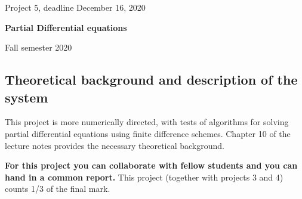 \documentclass[%
oneside,                 %
final,                   %
10pt]{article}
\begin{document}

\newcommand{\exercisesection}[1]{\subsection*{#1}}






\thispagestyle{empty}

\begin{center}
{\LARGE\bf
\begin{spacing}{1.25}
Project 5, deadline  December 16, 2020
\end{spacing}
}
\end{center}


\begin{center}
{\bf Partial Differential equations${}^{}$} \\ [0mm]
\end{center}

\begin{center}
\end{center}
    

\begin{center}
Fall semester 2020
\end{center}

\vspace{1cm}


\subsection*{Theoretical background and description of the system}

This project is more numerically directed, with tests
of algorithms for solving partial differential equations using finite difference schemes. 
Chapter 10 of the lecture notes provides the necessary theoretical background.

\textbf{For this project you can collaborate with fellow students and you can  hand in a common report.}
This project (together with projects 3 and 4) counts 1/3 of the final mark.
\end{document}
